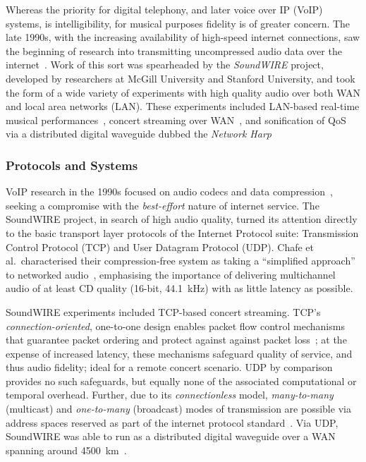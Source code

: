 \documentclass[utf8]{FrontiersinHarvard}
\begin{document}
    Whereas the priority for digital telephony, and later voice over IP (VoIP)
    systems, is intelligibility, for musical purposes fidelity is of greater
    concern.
    The late 1990s, with the increasing availability of high-speed internet
    connections, saw the beginning of research into transmitting uncompressed audio
    data over the internet~\citep{chafe_simplified_2000,xu_real-time_2000}.
    Work of this sort was spearheaded by the \textit{SoundWIRE} project, developed
    by researchers at McGill University and Stanford University, and took the form
    of a wide variety of experiments with high quality audio over both WAN and local
    area networks (LAN).
    These experiments included LAN-based real-time musical
    performances~\citep{chafe_simplified_2000}, concert streaming over
    WAN~\citep{xu_real-time_2000,chafe_simplified_2000}, and sonification of QoS via
    a distributed digital waveguide dubbed the
    \textit{Network Harp}~\citep{chafe_simplified_2000,chafe_physical_2002}

    \subsubsection{Protocols and Systems}\label{subsubsec:protocols-systems}

    VoIP research in the 1990s focused on audio codecs and data
    compression~\citep{turletti_inria_1994,hardman_successful_1998}, seeking a
    compromise with the \textit{best-effort} nature of internet service.
    The SoundWIRE project, in search of high audio quality, turned its attention
    directly to the basic transport layer protocols of the Internet Protocol suite:
    Transmission Control Protocol (TCP) and User Datagram Protocol (UDP).
    Chafe et al.\ characterised their compression-free system as taking a
    ``simplified approach'' to networked audio~\citep{chafe_simplified_2000},
    emphasising the importance of delivering multichannel audio of at least CD
    quality (16-bit, \qty{44.1}{\kHz}) with as little latency as possible.

    SoundWIRE experiments included TCP-based concert streaming.
    TCP's \textit{connection-oriented}, one-to-one design enables packet flow
    control mechanisms that guarantee packet ordering and protect against
    against packet loss~\citep{schiavoni_alternatives_2013,
        al-dhief_performance_2018};
    at the expense of increased latency, these mechanisms safeguard quality of
    service, and thus audio fidelity; ideal for a remote concert scenario.
    UDP by comparison provides no such safeguards, but equally none of the
    associated computational or temporal overhead.
    Further, due to its \textit{connectionless} model, \textit{many-to-many}
    (multicast) and \textit{one-to-many} (broadcast) modes of transmission are
    possible via address spaces reserved as part of the internet protocol
    standard~\citep{meyer_iana_2010}.
    Via UDP, SoundWIRE was able to run as a distributed digital waveguide over a
    WAN spanning around \qty{4500}{\km}~\citep{chafe_simplified_2000}.
\end{document}
